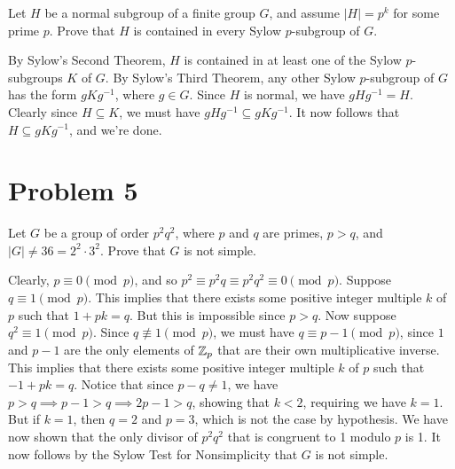 \documentclass{article}
\begin{document}
Let $H$ be a normal subgroup of a finite group $G$, and assume $|H|=p^k$
for some prime $p$.  Prove that $H$ is contained in every Sylow $p$-subgroup of $G$.

By Sylow's Second Theorem, $H$ is contained in at least one of the Sylow
$p$-subgroups $K$ of $G$.  By Sylow's Third Theorem, any other Sylow $p$-subgroup
of $G$ has the form $gKg^{-1}$, where $g\in G$.  Since $H$ is normal,
we have $gHg^{-1}=H$.  Clearly since $H\subseteq K$,
we must have $gHg^{-1}\subseteq gKg^{-1}$.  It now follows that
$H\subseteq gKg^{-1}$, and we're done.

\section*{Problem 5}

Let $G$ be a group of order $p^2q^2$, where $p$ and $q$ are primes,
$p>q$, and $|G|\neq 36=2^2\cdot 3^2$.  Prove that $G$ is not simple.

Clearly, $p\equiv 0\pmod{p}$, and so $p^2\equiv p^2q\equiv p^2q^2\equiv 0\pmod{p}$.
Suppose $q\equiv 1\pmod{p}$.  This implies that there exists
some positive integer multiple $k$ of $p$ such that $1+pk=q$.
But this is impossible since $p>q$.  Now suppose $q^2\equiv 1\pmod{p}$.
Since $q\not\equiv 1\pmod{p}$, we must have $q\equiv p-1\pmod{p}$,
since $1$ and $p-1$ are the only elements of $\mathbb{Z}_p$ that are their
own multiplicative inverse.  This implies that there exists
some positive integer multiple $k$ of $p$ such that $-1+pk=q$.
Notice that since $p-q\neq 1$, we have $p>q\implies p-1>q\implies 2p-1>q$,
showing that $k<2$, requiring we have $k=1$.
But if $k=1$, then $q=2$ and $p=3$, which is not the case by hypothesis.
We have now shown that the only divisor of $p^2q^2$ that is congruent
to 1 modulo $p$ is 1.  It now follows by the Sylow Test for Nonsimplicity
that $G$ is not simple.
\end{document}
